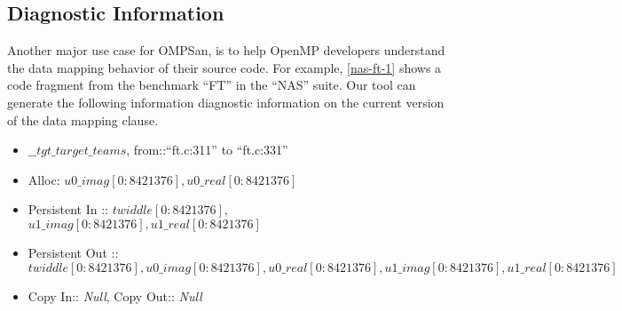 \subsection{Diagnostic Information}
\label{diagnostic}
Another major use case for OMPSan, is to help OpenMP developers 
understand 
the data mapping behavior of their source code. 
For example, \autoref{nas-ft-1} shows a code fragment 
from the benchmark ``FT'' in the ``NAS'' suite.
Our tool can generate the following information
diagnostic information on the current version 
 of the data mapping clause.
\begin{itemize}
    \vspace{-4pt}
 \item \texttt{$\_\_tgt\_target\_teams$}, from::``ft.c:311'' to ``ft.c:331''
 \item Alloc: $u0\_imag[0:8421376],u0\_real[0:8421376]$
 \item Persistent In :: $twiddle[0:8421376]$, 
 $u1\_imag[0:8421376],u1\_real[0:8421376]$
 \item  Persistent Out ::  $twiddle[0:8421376],u0\_imag[0:8421376],u0\_real[0:8421376],u1\_imag[0:8421376],u1\_real[0:8421376]$
 \item Copy In:: \textit{Null}, Copy Out:: \textit{Null} 
\end{itemize}
